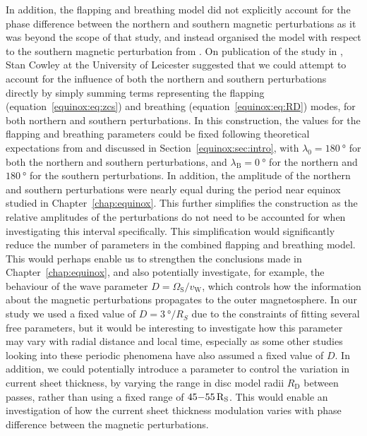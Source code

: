 In addition, the flapping and breathing  model did not explicitly account for the phase difference between the northern and southern magnetic perturbations as it was beyond the scope of that study, and instead organised the model with  respect to the southern magnetic perturbation from \citet{andrews2012}. On publication of the study in \citet{sorba2018}, Stan Cowley at the University of Leicester suggested that we could attempt to account for the influence of both the northern and southern perturbations directly by simply summing terms representing the flapping (equation~\ref{equinox:eq:zcs}) and breathing (equation~\ref{equinox:eq:RD}) modes, for both northern and southern perturbations. In this construction, the values for the flapping and breathing parameters could be fixed following theoretical expectations from \citet[e.g.][]{cowley2017a} and discussed in Section~\ref{equinox:sec:intro}, with $\lambda_0 = \SI{180}{\degree}$ for both the northern and southern perturbations, and $\lambda_\mathrm{B}=\SI{0}{\degree}$ for the northern and $\SI{180}{\degree}$ for the southern perturbations. In addition, the amplitude of the northern and southern perturbations were nearly equal during the period near equinox studied in  Chapter~\ref{chap:equinox}. This further simplifies the construction as the relative amplitudes of the perturbations do not need  to be accounted for when investigating this interval specifically. This simplification would significantly reduce the number of parameters  in the combined flapping and breathing model. This would perhaps enable  us to strengthen the conclusions made in Chapter~\ref{chap:equinox}, and also potentially investigate, for example, the behaviour of the wave parameter $D=\Omega_\mathrm{S}/v_\mathrm{W}$, which controls how the information about  the magnetic perturbations propagates to the outer magnetosphere. In our study we used a fixed value of $D=\SI{3}{\degree \per R_S}$ due to the constraints of fitting several free parameters, but it would be interesting to investigate how this parameter may vary with radial distance and local time, especially as some other studies looking into these periodic phenomena have also assumed a fixed value of $D$. In addition, we could potentially introduce a parameter to control the variation in current sheet thickness, by varying the range in disc model radii $R_\mathrm{D}$ between passes, rather than using a fixed range of $45{\--}\SI{55}{R_S}$. This would enable an investigation of how  the current sheet thickness modulation  varies with phase difference between the magnetic perturbations.

